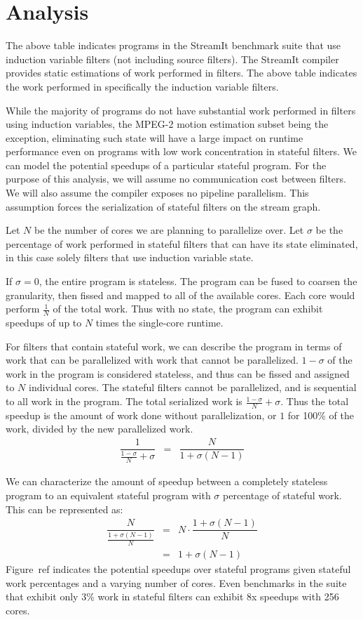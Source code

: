 \section{Analysis}

The above table indicates programs in the StreamIt benchmark suite that use induction variable filters (not including source filters).  The StreamIt compiler provides static estimations of work performed in filters.  The above table indicates the work performed in specifically the induction variable filters.

While the majority of programs do not have substantial work performed in filters using induction variables, the MPEG-2 motion estimation subset being the exception, eliminating such state will have a large impact on runtime performance even on programs with low work concentration in stateful filters.  We can model the potential speedups of a particular stateful program.  For the purpose of this analysis, we will assume no communication cost between filters.  We will also assume the compiler exposes no pipeline parallelism.  This assumption forces the serialization of stateful filters on the stream graph.

Let $N$ be the number of cores we are planning to parallelize over.  Let $\sigma$ be the percentage of work performed in stateful filters that can have its state eliminated, in this case solely filters that use induction variable state.  

If $\sigma = 0$, the entire program is stateless.  The program can be fused to coarsen the granularity, then fissed and mapped to all of the available cores.  Each core would perform $\frac{1}{N}$ of the total work.  Thus with no state, the program can exhibit speedups of up to $N$ times the single-core runtime.

For filters that contain stateful work, we can describe the program in terms of work that can be parallelized with work that cannot be parallelized.  $1-\sigma$ of the work in the program is considered stateless, and thus can be fissed and assigned to $N$ individual cores.  The stateful filters cannot be parallelized, and is sequential to all work in the program.  The total serialized work is $\frac{1-\sigma}{N} + \sigma$.  Thus the total speedup is the amount of work done without parallelization, or $1$ for 100\% of the work, divided by the new parallelized work.  
\begin{eqnarray*}
\dfrac{1}{\frac{1-\sigma}{N} + \sigma} &=& \dfrac{N}{1 + \sigma(N-1)}
\end{eqnarray*}

We can characterize the amount of speedup between a completely stateless program to an equivalent stateful program with $\sigma$ percentage of stateful work.  This can be represented as:
\begin{eqnarray*}
\dfrac{N}{\frac{1 + \sigma(N-1)}{N}} &=& N \cdot \dfrac{1 + \sigma(N-1)}{N} \\
&=& 1 + \sigma(N-1)
\end{eqnarray*}
Figure~ref{} indicates the potential speedups over stateful programs given stateful work percentages and a varying number of cores.  Even benchmarks in the suite that exhibit only 3\% work in stateful filters can exhibit 8x speedups with 256 cores.  